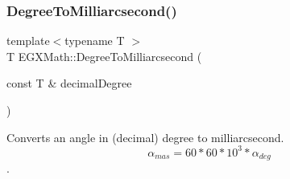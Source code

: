 \mbox{\label{group___e_g_x_math-_conversions-_angle_conversions-_degree_ga2c218e286b2ef72a00734dbc5a7f5ab6}} 
\subsubsection{\texorpdfstring{Degree\+To\+Milliarcsecond()}{DegreeToMilliarcsecond()}}
{\footnotesize\ttfamily template$<$typename T $>$ \\
T E\+G\+X\+Math\+::\+Degree\+To\+Milliarcsecond (\begin{DoxyParamCaption}\item[{const T \&}]{decimal\+Degree }\end{DoxyParamCaption})}



Converts an angle in (decimal) degree to milliarcsecond. \[\alpha_{mas}=60 * 60 * 10^3 * \alpha_{deg} \]. 

